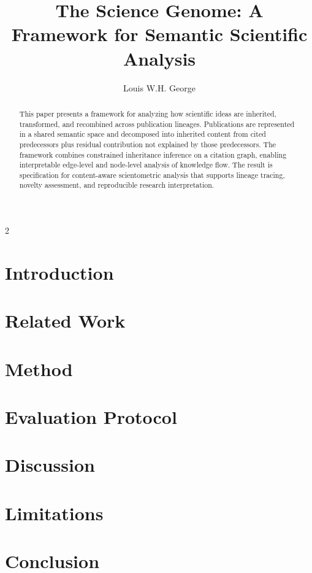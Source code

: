 \documentclass[11pt,a4paper]{article}
\begin{document}
\title{The Science Genome: A Framework for Semantic Scientific Analysis}

\author{Louis W.H. George}

\maketitle

\begin{abstract}
This paper presents a framework for analyzing how scientific ideas are inherited, transformed, and recombined across publication lineages. Publications are represented in a shared semantic space and decomposed into inherited content from cited predecessors plus residual contribution not explained by those predecessors. The framework combines constrained inheritance inference on a citation graph, enabling interpretable edge-level and node-level analysis of knowledge flow. The result is specification for content-aware scientometric analysis that supports lineage tracing, novelty assessment, and reproducible research interpretation.
\end{abstract}

\begin{multicols}{2}

\section{Introduction}


\section{Related Work}\label{sec:related}


\section{Method}\label{sec:method}


\section{Evaluation Protocol}\label{sec:experiments}


\section{Discussion}\label{sec:discussion}


\section{Limitations}\label{sec:lim_future}


\section{Conclusion}\label{sec:conclusion}


\end{multicols}
\end{document}
